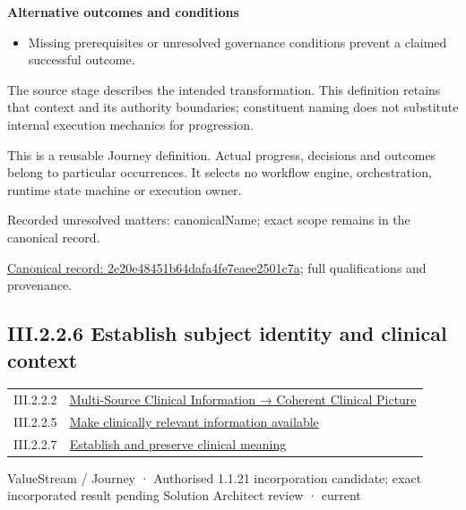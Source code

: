 \par\medskip\textbf{Alternative outcomes and conditions}\par


\begin{itemize}


\item Missing prerequisites or unresolved governance conditions prevent a claimed successful outcome.

\end{itemize}


The source stage describes the intended transformation. This definition retains that context and its authority boundaries; constituent naming does not substitute internal execution mechanics for progression.



This is a reusable Journey definition. Actual progress, decisions and outcomes belong to particular occurrences. It selects no workflow engine, orchestration, runtime state machine or execution owner.


{\small Recorded unresolved matters: canonicalName; exact scope remains in the canonical record.}\par
{\footnotesize \href{../../../../../../../continuum/strategy/value-stream/2e20e48451b64dafa4fe7eaee2501c7a.md}{Canonical record: 2e20e48451b64dafa4fe7eaee2501c7a}; full qualifications and provenance.}\par
\subsection*{III.2.2.6 Establish subject identity and clinical context}
\label{navigation:III.2.2.6}

\begin{longtable}{p{.22\linewidth}p{.73\linewidth}}
III.2.2.2 & \hyperref[element:01f655eae3d8485699449c3dcf4f9b56]{Multi-Source Clinical Information → Coherent Clinical Picture} \\
III.2.2.5 & \hyperref[element:2e20e48451b64dafa4fe7eaee2501c7a]{Make clinically relevant information available} \\
III.2.2.7 & \hyperref[element:e64c4ed500d84f0fa84a12646ea8b98d]{Establish and preserve clinical meaning} \\
\end{longtable}
\label{element:667853f4a4c343dcb559584cb08d71cf}
{\small ValueStream / Journey · Authorised 1.1.21 incorporation candidate; exact incorporated result pending Solution Architect review · current}\par

